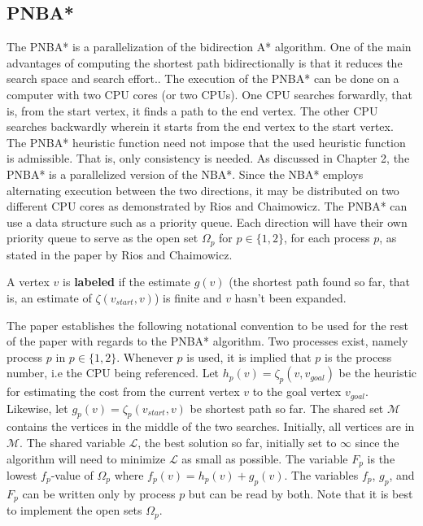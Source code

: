 \subsection{PNBA*}
The PNBA* is a parallelization of the bidirection A* algorithm. One of the main advantages of computing the shortest path 
bidirectionally is that it reduces the search space and search effort.\cite{KainlKainz1997,Pijls2009}. The execution of the PNBA*
can be done on a computer with two CPU cores (or two CPUs). One CPU searches forwardly, that is, from the start vertex, it finds a 
path to the end vertex. The other CPU searches backwardly wherein it starts from the end vertex to the start vertex. The PNBA* heuristic function 
need not impose that the used heuristic function is admissible. That is, only consistency is needed. As discussed in Chapter 2, the PNBA* is a 
parallelized version of the NBA*. Since the NBA* employs alternating execution between the two directions, it may be distributed on two different 
CPU cores as demonstrated by Rios and Chaimowicz. The PNBA* can use a data structure such as a priority queue. Each direction will have their own 
priority queue to serve as the open set $\Omega_p$ for $p\in\{1,2\}$, for each process $p$, as stated in the paper by Rios and Chaimowicz.

\begin{definition}
    A vertex $v$ is \textbf{labeled} if the estimate $g(v)$ (the shortest path found so far, that is, an estimate of $\zeta(v_{start}, v)$)
    is finite and $v$ hasn't been expanded.
\end{definition}

The paper establishes the following notational convention to be used for the rest of the paper with regards to the PNBA* algorithm. 
Two processes exist, namely process $p$ in $p\in\{1,2\}$. Whenever $p$ is used, it is implied that $p$ is the process number, i.e the CPU being 
referenced. Let $h_p(v)=\zeta_p(v, v_{goal})$ be the heuristic for estimating the cost from the current vertex $v$ to the goal vertex $v_{goal}$.
Likewise, let $g_p(v)=\zeta_p(v_{start}, v)$ be shortest path so far. The shared set $\mathcal{M}$ contains the vertices in the middle of the two searches.
Initially, all vertices are in $\mathcal{M}$. The shared variable $\mathcal{L}$, the best solution so far, initially set to $\infty$ since 
the algorithm will need to minimize $\mathcal{L}$ as small as possible. The variable $F_p$ is the lowest $f_p$-value of $\Omega_p$ where $f_p(v)=h_p(v)+g_p(v)$.
The variables $f_p$, $g_p$, and $F_p$ can be written only by process $p$ but can be read by both. Note that it is best to implement the open sets $\Omega_p$.


